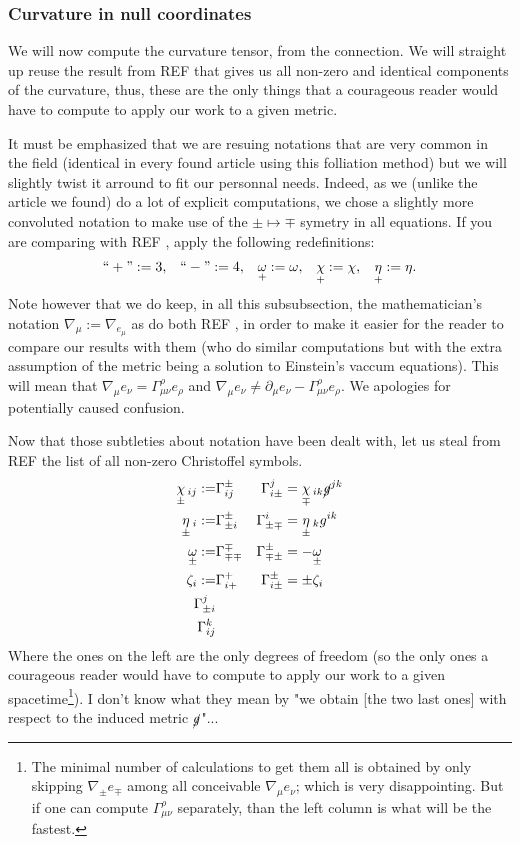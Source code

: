 \documentclass[a4paper,11pt]{article}
\numberwithin{equation}{section}
\theoremstyle{definition}
\begin{document}
\subsubsection{Curvature in null coordinates}
We will now compute the curvature tensor, from the connection. We will straight up reuse the result from \color{red}REF \color{black} that gives us all non-zero and identical components of the curvature, thus, these are the only things that a courageous reader would have to compute to apply our work to a given metric.

It must be emphasized that we are resuing notations that are very common in the field (identical in every found article using this folliation method) but we will slightly twist it arround to fit our personnal needs. Indeed, as we (unlike the article we found) do a lot of explicit computations, we chose a slightly more convoluted notation to make use of the $\pm\mapsto\mp$ symetry in all equations. If you are comparing with \color{red}REF \color{black}, apply the following redefinitions:
\begin{align*}
    ``+":=3, && ``-":=4, && \underset{+}{\omega}:=\omega, && \underset{+}{\chi}:=\chi, && \underset{+}{\eta}:=\eta.
\end{align*}
Note however that we do keep, in all this subsubsection, the mathematician's notation $\nabla_\mu:=\nabla_{e_\mu}$ as do both \color{red} REF \color{black}, in order to make it easier for the reader to compare our results with them (who do similar computations but with the extra assumption of the metric being a solution to Einstein's vaccum equations). This will mean that $\nabla_\mu e_\nu = \Gamma_{\mu\nu}^\rho e_\rho$ and $\nabla_\mu e_\nu \ne \partial_\mu e_\nu - \Gamma_{\mu\nu}^\rho e_\rho$. We apologies for potentially caused confusion.

Now that those subtleties about notation have been dealt with, let us steal from \color{red}REF \color{black} the list of all non-zero Christoffel symbols.
\begin{align*}
    \underset{\pm}{\chi}\,_{ij} :=&\Gamma_{ij}^\pm &\Gamma_{i\pm}^j&=\underset{\mp}{\chi}\,_{ik}\cancel{g}^{jk}\\
    \underset{\pm}{\eta}\,_i :=&\Gamma_{\pm i}^\pm &\Gamma_{\pm\mp}^i&=\underset{\pm}{\eta}\,_kg^{ik}\\
    \underset{\pm}{\omega}:=&\Gamma_{\mp\mp}^\mp &\Gamma_{\mp\pm}^\pm&=-\underset{\pm}{\omega}\\
    \zeta_i :=& \Gamma_{i+}^+ &\Gamma_{i\pm}^\pm&=\pm\zeta_i \\
    \Gamma_{\pm i}^j&\\
    \Gamma_{ij}^k&
\end{align*}
Where the ones on the left are the only degrees of freedom (so the only ones a courageous reader would have to compute to apply our work to a given spacetime\footnote{The minimal number of calculations to get them all is obtained by only skipping $\nabla_\pm e_\mp$ among all conceivable $\nabla_\mu e_\nu$; which is very disappointing. But if one can compute $\Gamma_{\mu\nu}^\rho$ separately, than the left column is what will be the fastest.}). \color{red} I don't know what they mean by "we obtain [the two last ones] with respect to the induced metric $\cancel{g}$"...\color{black}
\end{document}
